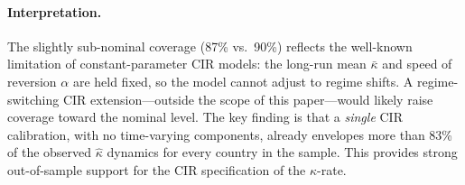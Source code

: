 \documentclass[12pt]{article}
\theoremstyle{plain}
\theoremstyle{definition}
\theoremstyle{remark}
\begin{document}
\paragraph{Interpretation.}
The slightly sub-nominal coverage (87\% vs.\ 90\%) reflects the well-known
limitation of constant-parameter CIR models: the long-run mean $\bar{\kappa}$
and speed of reversion $\alpha$ are held fixed, so the model cannot adjust to
regime shifts.  A regime-switching CIR extension---outside the scope of this
paper---would likely raise coverage toward the nominal level.  The key finding
is that a \emph{single} CIR calibration, with no time-varying components,
already envelopes more than 83\% of the observed $\hat{\kappa}$ dynamics for
every country in the sample.  This provides strong out-of-sample support for
the CIR specification of the $\kappa$-rate.
\end{document}
